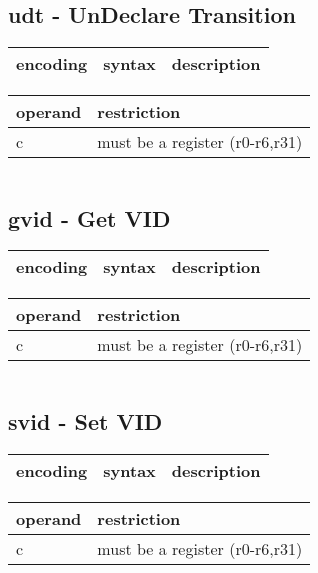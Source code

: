 \documentclass[letterpaper,10pt,openright,twoside,onecolumn]{book}
\begin{document}
  \begin{verbatim}
  \end{verbatim}
\newpage\subsection{udt - UnDeclare Transition}
  \begin{tabular}{|l|l|l|}
   \hline
    encoding & syntax & description \\
   \hline
   \hline
  \end{tabular}
  \flushleft
  \begin{tabular}{|l|l|}
   \hline
    operand & restriction \\
   \hline
    c & must be a register (r0-r6,r31) \\
   \hline
  \end{tabular}
  \begin{verbatim}
  \end{verbatim}
\newpage\subsection{gvid - Get VID}
  \begin{tabular}{|l|l|l|}
   \hline
    encoding & syntax & description \\
   \hline
   \hline
  \end{tabular}
  \flushleft
  \begin{tabular}{|l|l|}
   \hline
    operand & restriction \\
   \hline
    c & must be a register (r0-r6,r31) \\
   \hline
  \end{tabular}
  \begin{verbatim}
  \end{verbatim}
\newpage\subsection{svid - Set VID}
  \begin{tabular}{|l|l|l|}
   \hline
    encoding & syntax & description \\
   \hline
   \hline
  \end{tabular}
  \flushleft
  \begin{tabular}{|l|l|}
   \hline
    operand & restriction \\
   \hline
    c & must be a register (r0-r6,r31) \\
   \hline
  \end{tabular}
  \begin{verbatim}
  \end{verbatim}
\end{document}

